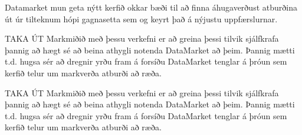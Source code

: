 \documentclass{article}
\begin{document}
Datamarket mun geta nýtt kerfið okkar bæði til að finna áhugaverðust atburðina
út úr tilteknum hópi gagnasetta sem og keyrt það á nýjustu uppfærslurnar.

TAKA ÚT Markmiðið með þessu verkefni er að greina þessi tilvik sjálfkrafa þannig
að hægt sé að beina athygli notenda DataMarket að þeim. Þannig mætti t.d. hugsa
sér að dregnir yrðu fram á forsíðu DataMarket tenglar á þróun sem kerfið telur
um markverða atburði að ræða.


{
  \color{red}
TAKA ÚT Markmiðið með þessu verkefni er að greina þessi tilvik sjálfkrafa þannig að hægt sé að beina athygli notenda DataMarket að þeim. Þannig mætti t.d. hugsa sér að dregnir yrðu fram á forsíðu DataMarket tenglar á þróun sem kerfið telur um markverða atburði að ræða.
}
\end{document}
